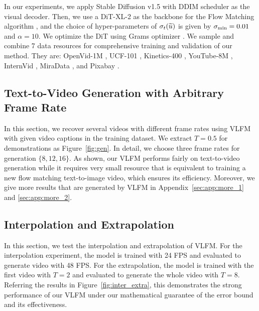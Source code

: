 In our experiments, we apply Stable Diffusion v1.5 \cite{rbl+22} with DDIM scheduler \cite{sme20} as the visual decoder. Then, we use a DiT-XL-2 \cite{px23} as the backbone for the Flow Matching algorithm \cite{lcb+22,lgl22}, and the choice of hyper-parameters of $\sigma_t(\widetilde{u})$ is given by $\sigma_{\rm min} = 0.01$ and $\alpha = 10$. We optimize the DiT using Grams optimizer \cite{cls24}. We sample and combine 7 data resources for comprehensive training and validation of our method. They are:
OpenVid-1M \cite{nxz+24},
UCF-101 \cite{szs12},
Kinetics-400 \cite{kcs+17},
YouTube-8M \cite{akl+16},
InternVid \cite{whl+23},
MiraData \cite{jgz+24}, and
Pixabay \cite{pixabay}. 

\ifdefined\isarxiv
\else
\vspace{-4mm}
\fi

\subsection{Text-to-Video Generation with Arbitrary Frame Rate} \label{sub:exp_gen}

In this section, we recover several videos with different frame rates using VLFM with given video captions in the training dataset. We extract $T= 0.5$ for demonstrations as Figure~\ref{fig:gen}. In detail, we choose three frame rates for generation $\{8, 12, 16\}$. As shown, our VLFM performs fairly on text-to-video generation while it requires very small resource that is equivalent to training a new flow matching text-to-image video, which ensures its efficiency. Moreover, we give more results that are generated by VLFM in Appendix~\ref{sec:app:more_1} and \ref{sec:app:more_2}.
\ifdefined\isarxiv
\else
\vspace{-3mm}
\fi

\subsection{Interpolation and Extrapolation} \label{sub:exp_inter_extra}

In this section, we test the interpolation and extrapolation of VLFM. For the interpolation experiment, the model is trained with 24 FPS and evaluated to generate video with 48 FPS. For the extrapolation, the model is trained with the first video with $T = 2$ and evaluated to generate the whole video with $T = 8$. Referring the results in Figure~\ref{fig:inter_extra}, this demonstrates the strong performance of our VLFM under our mathematical guarantee of the error bound and its effectiveness.

